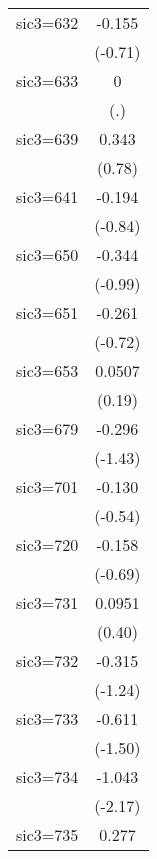 \begin{table}[htbp]
\begin{tabular*}{0.8\hsize}{@{\hskip\tabcolsep\extracolsep\fill}l*{1}{c}}
\addlinespace
sic3=632            &      -0.155         \\
                    &     (-0.71)         \\
\addlinespace
sic3=633            &           0         \\
                    &         (.)         \\
\addlinespace
sic3=639            &       0.343         \\
                    &      (0.78)         \\
\addlinespace
sic3=641            &      -0.194         \\
                    &     (-0.84)         \\
\addlinespace
sic3=650            &      -0.344         \\
                    &     (-0.99)         \\
\addlinespace
sic3=651            &      -0.261         \\
                    &     (-0.72)         \\
\addlinespace
sic3=653            &      0.0507         \\
                    &      (0.19)         \\
\addlinespace
sic3=679            &      -0.296         \\
                    &     (-1.43)         \\
\addlinespace
sic3=701            &      -0.130         \\
                    &     (-0.54)         \\
\addlinespace
sic3=720            &      -0.158         \\
                    &     (-0.69)         \\
\addlinespace
sic3=731            &      0.0951         \\
                    &      (0.40)         \\
\addlinespace
sic3=732            &      -0.315         \\
                    &     (-1.24)         \\
\addlinespace
sic3=733            &      -0.611         \\
                    &     (-1.50)         \\
\addlinespace
sic3=734            &      -1.043\sym{*}  \\
                    &     (-2.17)         \\
\addlinespace
sic3=735            &       0.277         \\

\end{tabular*}
\end{table}
